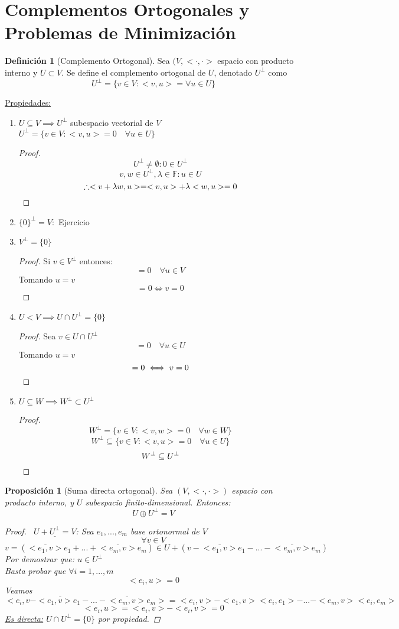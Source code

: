 \documentclass[11pt]{book}
\newcommand{\set}[1]{\mathbb{#1}}
\newtheorem{prop}[thm]{Proposición}
\theoremstyle{definition}
\newtheorem{defn}{Definición}[section]
\begin{document}
\section{Complementos Ortogonales y Problemas de Minimización}
\begin{defn}[Complemento Ortogonal]
	Sea $(V,<\cdot,\cdot>$ espacio con producto interno y $U\subset V$. Se define el complemento ortogonal de $U$, denotado $U^\perp$ como
	\[U^\perp=\{v\in V:<v,u>=\forall u\in U\}\]
\end{defn}
\underline{Propiedades:}
\begin{enumerate}[label=\textbf{(\alph*)}]
	\item $U\subseteq V\implies U^\perp$ subespacio vectorial de $V$\\
	      $U^\perp=\{v\in V:<v,u>=0\quad\forall u\in U\}$
	      \begin{proof}
		      \[U^\perp\neq\emptyset:0\in U^\perp\]
		      \[v,w\in U^\perp,\lambda\in\set{F}: u\in U\]
		      \[\therefore<v+\lambda w,u>=<v,u>+\lambda<w,u>=0\qedhere\]
	      \end{proof}

	\item $\{0\}^\perp=V:$ Ejercicio

	\item $V^\perp=\{0\}$
	      \begin{proof}
		      Si $v\in V^\perp$ entonces:
		      \[<v,u>=0\quad\forall u\in V\]
		      Tomando $u=v$
		      \[<v,v>=0\iff v=0\]
	      \end{proof}

	\item $U<V\implies U\cap U^\perp=\{0\}$
	      \begin{proof}
		      Sea $v\in U\cap U^\perp$
		      \[<v,u>=0\quad\forall u\in U\]
		      Tomando $u=v$
		      \[<v,v>=0\iff v=0\qedhere\]
	      \end{proof}

	\item $U\subseteq W\implies W^\perp\subset U^\perp$
	      \begin{proof}
		      \[W^\perp=\{v\in V:<v,w>=0\quad\forall w\in W\}\]
		      \[W^\perp\subseteq\{v\in V:<v,u>=0\quad\forall u\in U\}\]
		      \[W^\perp\subseteq U^\perp\qedhere\]
	      \end{proof}
\end{enumerate}
\begin{prop}[Suma directa ortogonal]
	Sea $(V,<\cdot,\cdot>)$ espacio con producto interno, y $U$ subespacio finito-dimensional. Entonces:
	\[U\oplus U^\perp=V\]
	\begin{proof}
		\
		$\underline{U+U^\perp=V}$: Sea $e_1,...,e_m$ base ortonormal de $V$
		\[\forall v\in V\]
		\[v=(\overline{<e_1,v>}e_1+...+\overline{<e_m,v>}e_m)\in U+(v-\overline{<e_1,v>}e_1-...-\overline{<e_m,v>}e_m)\]
		Por demostrar que: $u\in U^\perp$\\
		Basta probar que $\forall i=1,...,m$
		\[<e_i,u>=0\]
		Veamos
		\[<e_i,v-<\overline{e_1,v>}e_1-...-\overline{<e_m,v>}e_m>=<e_i,v>-<e_1,v><e_i,e_1>-...-<e_m,v><e_i,e_m>\]
		\[<e_i,u>=<e_i,v>-<e_i,v>=0\]
		\underline{Es directa:} $U\cap U^\perp=\{0\}$ por propiedad.
	\end{proof}
\end{prop}
\end{document}
